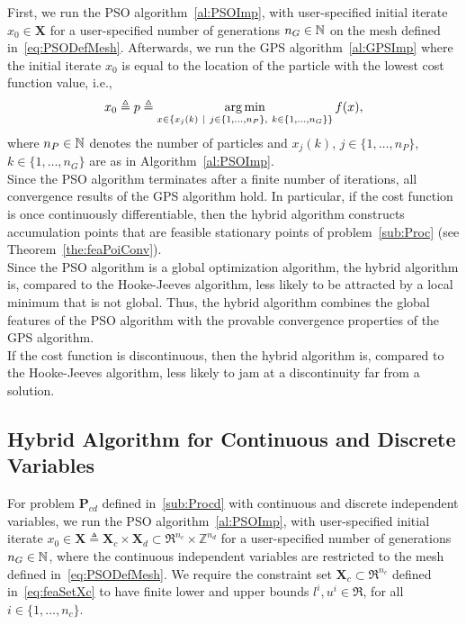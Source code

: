 First, we run the PSO algorithm~\ref{al:PSOImp}, 
with user-specified initial iterate $x_0 \in \mathbf X$
for a user-specified number of generations $n_G \in {\mathbb N}$
on the mesh defined in~\eqref{eq:PSODefMesh}.
Afterwards, we run the GPS algorithm~\ref{al:GPSImp}
where the initial iterate $x_0$ is equal to the location of the particle with 
the lowest cost function value, i.e.,
\begin{equation}
  x_0 \triangleq p \triangleq \mathop{\arg \min}_{x \in \{ x_j(k) \ | \ j \in \{1, \ldots, n_P \}, \
k \in \{1, \ldots, n_G \} \} } f(x),
\label{eq:hyGPSPSODefP}
\end{equation}
where $n_P \in {\mathbb N}$ denotes the number of particles and
$x_j(k)$, $j \in \{1, \ldots, n_P \}$, $k \in \{1, \ldots, n_G \}$
are as in Algorithm~\ref{al:PSOImp}.\\

Since the PSO algorithm terminates after a finite number of iterations,
all convergence results of the GPS algorithm hold.
In particular, if the cost function is once continuously differentiable,
then the hybrid algorithm constructs accumulation points that
are feasible stationary points of problem~\eqref{sub:Proc}
(see Theorem~\ref{the:feaPoiConv}).\\

Since the PSO algorithm is a global optimization algorithm,
the hybrid algorithm is, compared to the Hooke-Jeeves algorithm,
less likely to be attracted by a local minimum that is not global.
Thus, the hybrid algorithm combines the global features of the
PSO algorithm with the provable convergence properties
of the GPS algorithm.\\

If the cost function is discontinuous, then the hybrid algorithm is, 
compared to the Hooke-Jeeves algorithm,
less likely to jam at a discontinuity far from a solution.


\subsection[For Continuous and Discrete Variables]{Hybrid Algorithm for Continuous and Discrete Variables}
For problem $\mathbf P_{cd}$ defined in~\eqref{sub:Procd}
with continuous and discrete independent variables,
we run the PSO algorithm~\ref{al:PSOImp}, 
with user-specified initial iterate 
$x_0 \in \mathbf X \triangleq \mathbf X_c \times \mathbf X_d \subset \Re^{n_c} \times \mathbb Z^{n_d}$
for a user-specified number of generations $n_G \in {\mathbb N}$, where the continuous 
independent variables are restricted to the 
mesh defined in~\eqref{eq:PSODefMesh}.
We require the constraint set $\mathbf X_c \subset \Re^{n_c}$ 
defined in~\eqref{eq:feaSetXc} to have finite lower and upper bounds
$l^i, u^i \in \Re$, for all $i \in \{1, \ldots, n_c\}$.\\


